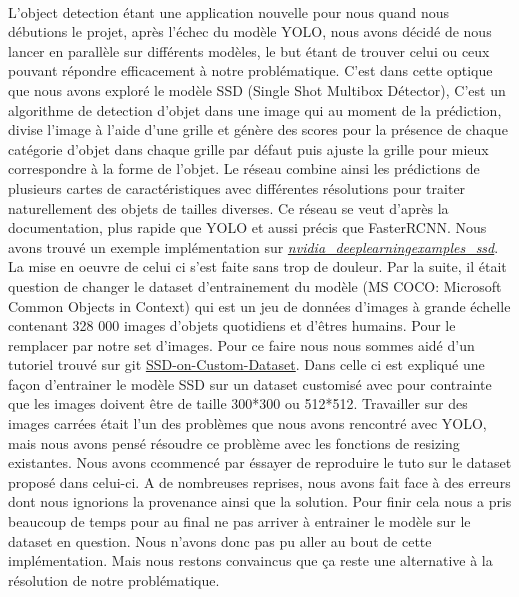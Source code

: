 \paragraph{} L'object detection étant une application nouvelle pour nous quand nous débutions le projet, après l'échec du modèle YOLO, nous avons décidé de nous lancer en parallèle sur différents modèles, le but étant de trouver celui ou ceux pouvant répondre efficacement à notre problématique. C'est dans cette optique que nous avons exploré le modèle SSD (Single Shot Multibox Détector), C'est un algorithme de detection d'objet dans une image qui au moment de la prédiction, divise l’image à l’aide d’une grille et génère des scores pour la présence de chaque catégorie d'objet dans chaque grille par défaut puis ajuste la grille pour mieux correspondre à la forme de l'objet. 
Le réseau combine ainsi les prédictions de plusieurs cartes de caractéristiques avec différentes résolutions pour traiter naturellement des objets de tailles diverses. Ce réseau se veut d'après la documentation, plus rapide que YOLO et aussi précis que FasterRCNN. Nous avons trouvé un exemple implémentation sur \href{https://pytorch.org/hub/nvidia_deeplearningexamples_ssd/}{\textit{nvidia_deeplearningexamples_ssd}}. La mise en oeuvre de celui ci s'est faite sans trop de douleur. Par la suite, il était question de changer le dataset d'entrainement du modèle (MS COCO: Microsoft Common Objects in Context) 
qui est un jeu de données d'images à grande échelle contenant 328 000 images d'objets quotidiens et d'êtres humains. Pour le remplacer par notre set d'images. Pour ce faire nous nous sommes aidé d'un tutoriel trouvé sur git \href{https://github.com/Coldmooon/SSD-on-Custom-Dataset}{SSD-on-Custom-Dataset}. Dans celle ci est expliqué une façon d'entrainer le modèle SSD sur un dataset customisé avec pour contrainte que les images doivent être de taille 300*300 ou 512*512. Travailler sur des images carrées était l'un des problèmes que nous avons rencontré avec YOLO, mais nous avons pensé résoudre ce problème avec les fonctions de resizing existantes. 
Nous avons ccommencé par éssayer de reproduire le tuto sur le dataset proposé dans celui-ci. A de nombreuses reprises, nous avons fait face à des erreurs dont nous ignorions la provenance ainsi que la solution. Pour finir cela nous a pris beaucoup de temps pour au final ne pas arriver à entrainer le modèle sur le dataset en question. Nous n'avons donc pas pu aller au bout de cette implémentation. Mais nous restons convaincus que ça reste une alternative à la résolution de notre problématique.

